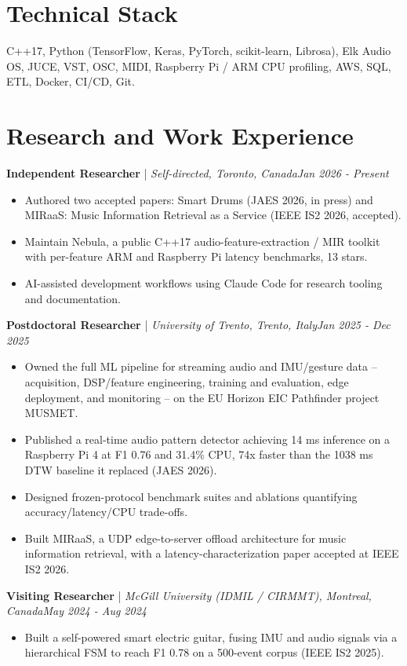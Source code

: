 \documentclass[11pt]{article}
\newenvironment{cvrole}[5]{%
  \par\noindent\textbf{\large #1} | \textit{\small #2, #3}\hfill \textit{\small #4 - #5}\par
  \begin{itemize}[leftmargin=2em, itemsep=-0.3em, topsep=-0.5em]%
}{%
  \end{itemize}\par\noindent\mbox{}\par\vspace{0.1em}%
}
\begin{document}
\section*{Technical Stack}
C++17, Python (TensorFlow, Keras, PyTorch, scikit-learn, Librosa), Elk Audio OS, JUCE, VST, OSC, MIDI, Raspberry Pi / ARM CPU profiling, AWS, SQL, ETL, Docker, CI/CD, Git.

\section*{Research and Work Experience}

\begin{cvrole}{Independent Researcher}{Self-directed}{Toronto, Canada}{Jan 2026}{Present}
\item Authored two accepted papers: Smart Drums (JAES 2026, in press) and MIRaaS: Music Information Retrieval as a Service (IEEE IS2 2026, accepted).
\item Maintain Nebula, a public C++17 audio-feature-extraction / MIR toolkit with per-feature ARM and Raspberry Pi latency benchmarks, 13 stars.
\item AI-assisted development workflows using Claude Code for research tooling and documentation.
\end{cvrole}

\begin{cvrole}{Postdoctoral Researcher}{University of Trento}{Trento, Italy}{Jan 2025}{Dec 2025}
\item Owned the full ML pipeline for streaming audio and IMU/gesture data -- acquisition, DSP/feature engineering, training and evaluation, edge deployment, and monitoring -- on the EU Horizon EIC Pathfinder project MUSMET.
\item Published a real-time audio pattern detector achieving 14 ms inference on a Raspberry Pi 4 at F1 0.76 and 31.4\% CPU, 74x faster than the 1038 ms DTW baseline it replaced (JAES 2026).
\item Designed frozen-protocol benchmark suites and ablations quantifying accuracy/latency/CPU trade-offs.
\item Built MIRaaS, a UDP edge-to-server offload architecture for music information retrieval, with a latency-characterization paper accepted at IEEE IS2 2026.
\end{cvrole}

\begin{cvrole}{Visiting Researcher}{McGill University (IDMIL / CIRMMT)}{Montreal, Canada}{May 2024}{Aug 2024}
\item Built a self-powered smart electric guitar, fusing IMU and audio signals via a hierarchical FSM to reach F1 0.78 on a 500-event corpus (IEEE IS2 2025).
\end{cvrole}
\end{document}
